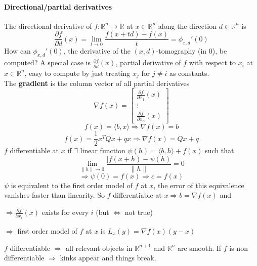 \documentclass[10pt]{report}
\begin{document}
\paragraph{Directional/partial derivatives} The directional derivative of $f:\mathbb{R}^n\rightarrow \mathbb{R}$ at $x\in \mathbb{R}^n$ along the direction $d\in \mathbb{R}^n$ is $$\frac{\partial f}{\partial d}(x) = \lim_{t\to 0}\frac{f(x+td) - f(x)}{t} = \phi_{x,d}'(0)$$
How can $\phi_{x,d}'(0)$, the derivative of the $(x,d)$-tomography (in 0), be computed? A special case is $\frac{\partial f}{\partial d}(x)$, partial derivative of $f$ with respect to $x_i$ at $x\in \mathbb{R}^n$, easy to compute by just treating $x_j$ for $j\neq i$ as constants.\\
The \textbf{gradient} is the column vector of all partial derivatives $$\nabla f(x) = \left[\begin{array}{c}
\frac{\partial f}{\partial x_1}(x)\\
\vdots\\
\frac{\partial f}{\partial x_n}(x)
\end{array}\right]$$
$$f(x) = \langle b,x\rangle \Rightarrow\nabla f(x) = b$$
$$f(x) = \frac{1}{2}x^TQx + qx \Rightarrow\nabla f(x) = Qx + q$$
$f$ differentiable at $x$ if $\exists$ linear function $\psi(h) =\langle b,h\rangle + f(x)$ such that $$\lim_{\|h\|\to 0}\frac{|f(x+h) - \psi(h)}{\|h\|} = 0$$ $$\Rightarrow \psi(0) = f(x) \Rightarrow c = f(x)$$
$\psi$ is equivalent to the first order model of $f$ at $x$, the error of this equivalence vanishes faster than linearity. So $f$ differentiable at $x\Rightarrow b = \nabla f(x)$ and\begin{list}{}{}
	\item $\Rightarrow \frac{\partial f}{\partial x_i}(x)$ exists for every $i$ (but $\Leftrightarrow$ not true)
	\item $\Rightarrow$ first order model of $f$ at $x$ is $L_x(y) = \nabla f(x)(y-x)$
\end{list}
$f$ differentiable $\Rightarrow$ all relevant objects in $\mathbb{R}^{n+1}$ and $\mathbb{R}^n$ are smooth. If $f$ is non differentiable $\Rightarrow$ kinks appear and things break,
\end{document}
